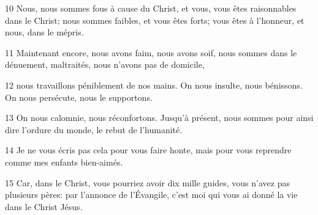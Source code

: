 
10 Nous, nous sommes fous à cause du Christ, et vous, vous êtes raisonnables dans le Christ; nous sommes faibles, et vous êtes forts; vous êtes à l’honneur, et nous, dans le mépris.

11 Maintenant encore, nous avons faim, nous avons soif, nous sommes dans le dénuement, maltraités, nous n’avons pas de domicile,

12 nous travaillons péniblement de nos mains. On nous insulte, nous bénissons. On nous persécute, nous le supportons.

13 On nous calomnie, nous réconfortons. Jusqu’à présent, nous sommes pour ainsi dire l’ordure du monde, le rebut de l’humanité.

14 Je ne vous écris pas cela pour vous faire honte, mais pour vous reprendre comme mes enfants bien-aimés.

15 Car, dans le Christ, vous pourriez avoir dix mille guides, vous n’avez pas plusieurs pères: par l’annonce de l’Évangile, c’est moi qui vous ai donné la vie dans le Christ Jésus.